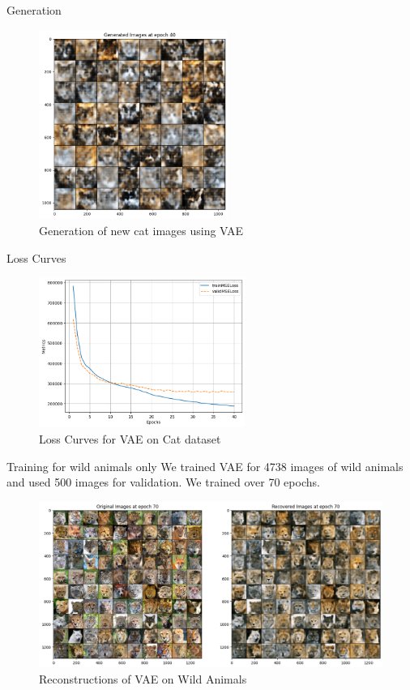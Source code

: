 \begin{frame}{Generation}
    \begin{figure}
        \centering
        \includegraphics[width=0.55\textwidth]{../ReportNeurips/CatGeneration1.png}
        \caption{Generation of new cat images using VAE}
    \end{figure}
\end{frame}

\begin{frame}{Loss Curves}
    \begin{figure}
        \centering
        \includegraphics[width=0.6\textwidth]{../ReportNeurips/catLoss.png}
        \caption{Loss Curves for VAE on Cat dataset}
    \end{figure}
\end{frame}

\begin{frame}{Training for wild animals only}
    We trained VAE for 4738 images of wild animals and used 500 images for validation. We trained over 70 epochs.
    \begin{figure}
        \centering
        \includegraphics[width=1\textwidth]{../ReportNeurips/wildanimal.png}
        \caption{Reconstructions of VAE on Wild Animals}
    \end{figure}
\end{frame}

